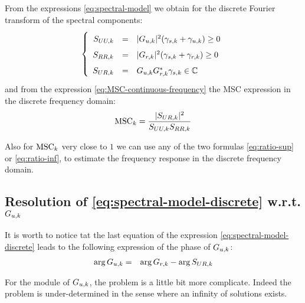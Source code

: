 From the expressions \eqref{eq:spectral-model} we obtain for the discrete Fourier transform of the spectral components:
\begin{eqnarray}
\label{eq:spectral-model-discrete}
\left\{
\renewcommand\arraystretch{1.6}
\begin{array}{rcl}
S_{UU,k}&=&|G_{\ut,k}|^{2} (\gamma_{s,k}+\gamma_{\ut,k})\geq 0
\\
S_{RR,k}&=&|G_{\rf,k}|^{2} (\gamma_{s,k}+\gamma_{\rf,k})\geq 0
\\
S_{UR,k}&=&G_{\ut,k}G^{*}_{\rf,k}\gamma_{s,k}\in\mathbb{C}
\end{array}
\right.
\end{eqnarray}
and from the expression \eqref{eq:MSC-continuous-frequency} the MSC expression in the discrete frequency domain:
\begin{eqnarray}
 \label{eq:exact-MSC}
\mathrm{MSC}_{k} = \frac{|{S_{UR,k}}|^{2}}{{S_{UU,k}}{S_{RR,k}}}
\end{eqnarray}

Also for $\mathrm{MSC}_{k}$ very close to $1$ we can use any of the two formulas \eqref{eq:ratio-sup} or \eqref{eq:ratio-inf}, to estimate the frequency response in the discrete frequency domain. 







\subsection{Resolution of \eqref{eq:spectral-model-discrete} w.r.t. $G_{{u},k}$}

It is worth to notice tat the last equation of the expression \eqref{eq:spectral-model-discrete} leads to the following expression of the phase of $G_{{u},k}$:
\begin{eqnarray}
 \label{eq:phase-estimation}
 \arg G_{{u},k}&=& \arg G_{{r},k}- \arg S_{UR,k}
\end{eqnarray}

For the module of $G_{{u},k}$, the problem is a little bit more complicate. Indeed the problem is under-determined in the sense where an infinity of solutions exists. 


